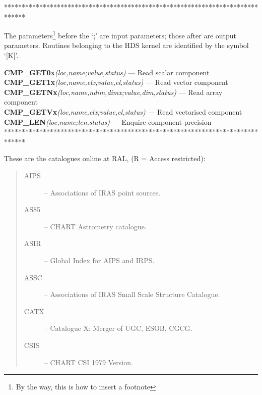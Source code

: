 \documentclass[twoside,11pt]{article}
\begin{document}
******************************************************************************

The parameters\footnote{By the way, this is how to insert a footnote} before
the `;' are input parameters; those after are output parameters.
Routines belonging to the HDS kernel are identified by the symbol `[K]'.

\noindent
\textbf{CMP\_GET0x}\emph{(loc,name;value,status)} --- Read scalar component\\
\textbf{CMP\_GET1x}\emph{(loc,name,elx;value,el,status)} --- Read vector component\\
\textbf{CMP\_GETNx}\emph{(loc,name,ndim,dimx;value,dim,status)} --- Read array 
component\\
\textbf{CMP\_GETVx}\emph{(loc,name,elx;value,el,status)} --- Read vectorised 
component\\
\textbf{CMP\_LEN}\emph{(loc,name;len,status)} --- Enquire component precision\\

******************************************************************************

These are the catalogues online at RAL, (R = Access restricted):
\begin{quote}
  \begin{description}
    \item [AIPS] -- Associations of IRAS point sources.
    \item [AS85] -- CHART Astrometry catalogue.
    \item [ASIR] -- Global Index for AIPS and IRPS.
    \item [ASSC] -- Associations of IRAS Small Scale Structure Catalogue.
    \item [CATX] -- Catalogue X: Merger of UGC, ESOB, CGCG.
    \item [CSIS] -- CHART CSI 1979 Version.
  \end{description}
\end{quote}

\newpage
\end{document}
